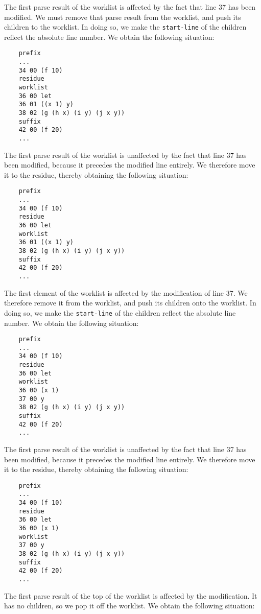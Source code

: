 The first parse result of the worklist is affected by the fact that
line 37 has been modified.  We must remove that parse result from the
worklist, and push its children to the worklist.  In doing so, we make
the \texttt{start-line} of the children reflect the absolute line
number.  We obtain the following situation:

{\small\begin{verbatim}
    prefix
    ...
    34 00 (f 10)
    residue
    worklist
    36 00 let
    36 01 ((x 1) y)
    38 02 (g (h x) (i y) (j x y))
    suffix
    42 00 (f 20)
    ...
\end{verbatim}}

The first parse result of the worklist is unaffected by the fact that
line 37 has been modified, because it precedes the modified line
entirely.  We therefore move it to the residue, thereby obtaining the
following situation:

{\small\begin{verbatim}
    prefix
    ...
    34 00 (f 10)
    residue
    36 00 let
    worklist
    36 01 ((x 1) y)
    38 02 (g (h x) (i y) (j x y))
    suffix
    42 00 (f 20)
    ...
\end{verbatim}}

The first element of the worklist is affected by the modification of
line 37.  We therefore remove it from the worklist, and push its
children onto the worklist.  In doing so, we make the
\texttt{start-line} of the children reflect the absolute line number.
We obtain the following situation:

{\small\begin{verbatim}
    prefix
    ...
    34 00 (f 10)
    residue
    36 00 let
    worklist
    36 00 (x 1)
    37 00 y
    38 02 (g (h x) (i y) (j x y))
    suffix
    42 00 (f 20)
    ...
\end{verbatim}}

The first parse result of the worklist is unaffected by the fact that
line 37 has been modified, because it precedes the modified line
entirely.  We therefore move it to the residue, thereby obtaining the
following situation:

{\small\begin{verbatim}
    prefix
    ...
    34 00 (f 10)
    residue
    36 00 let
    36 00 (x 1)
    worklist
    37 00 y
    38 02 (g (h x) (i y) (j x y))
    suffix
    42 00 (f 20)
    ...
\end{verbatim}}

The first parse result of the top of the worklist is affected by the
modification.  It has no children, so we pop it off the worklist.  We
obtain the following situation:

